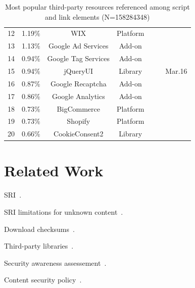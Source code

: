 \documentclass[sigconf,table]{acmart}
\def\yessymbol{\ding{51}}
\begin{document}
\begin{table}[h]
\begin{tabular}{ccccccc}
12            & \num{1.19}\%		& WIX                 & Platform      &						&				&                   \\
13            & \num{1.13}\%		& Google Ad Services  & Add-on        & \yessymbol			&				&                   \\
14            & \num{0.94}\%		& Google Tag Services & Add-on        & \yessymbol			&				&                   \\
15            & \num{0.94}\%		& jQueryUI            & Library       & \yessymbol			& \yessymbol	& Mar.16            \\
16            & \num{0.87}\%		& Google Recaptcha    & Add-on        & \yessymbol			& 				&                   \\
17            & \num{0.86}\%		& Google Analytics    & Add-on        & \yessymbol			&				&                   \\
18            & \num{0.73}\%		& BigCommerce         & Platform      &						& 				&                   \\
19            & \num{0.73}\%		& Shopify             & Platform      &						& \yessymbol	&                   \\
20            & \num{0.66}\%		& CookieConsent2      & Library       & \yessymbol			&				&                   \\ 
\bottomrule	
\end{tabular}
\caption{Most popular third-party resources referenced among script and link elements (N=\num{158284348})}
	\label{table:top-libraries}
\end{table}




\section{Related Work} \label{sec:rw}

SRI~\cite{w3c_subresource_2016,shah_measurement_2018,shah_securing_2017,van_acker_measuring_2017,anis_securing_2018}.

SRI limitations for unknown content~\cite{kumar_security_2017,soni_sicilian_2015}.

Download checksums~\cite{cherubini_towards_2018}.

Third-party libraries~\cite{lauinger_thou_2017}.

Security awareness assessement~\cite{krombholz_if_2019}.

Content security policy~\cite{calzavara_content_2016,afanasyev_content-based_2016,van_acker_measuring_2017,some_content_2017}.
\end{document}
